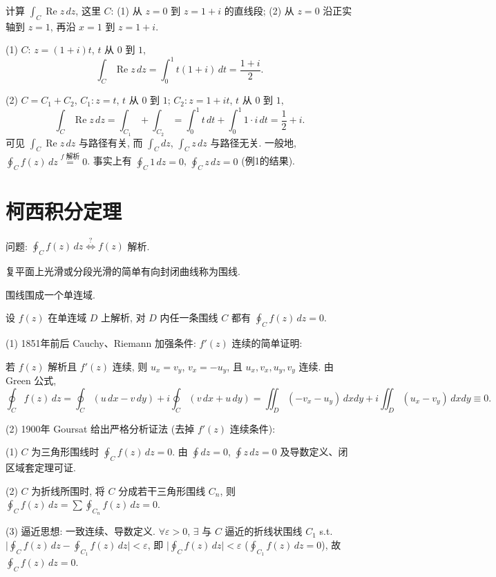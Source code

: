 \documentclass[theorem=false,mathfont=none,openany,sub3section]{easybook}
\begin{document}
\begin{example}
  计算 $\int_{C}\operatorname{Re}z\,dz$, 这里 $C$:
  (1) 从 $z=0$ 到 $z=1+i$ 的直线段;
  (2) 从 $z=0$ 沿正实轴到 $z=1$, 再沿 $x=1$ 到 $z=1+i$.

  (1) $C$: $z=(1+i)t$, $t$ 从 $0$ 到 $1$,
  \[
  \int_{C}\operatorname{Re}z\,dz=\int_{0}^{1}t(1+i)\,dt=\frac{1+i}{2}.
  \]

  (2) $C=C_{1}+C_{2}$, $C_{1}:z=t$, $t$ 从 $0$ 到 $1$; $C_{2}:z=1+it$, $t$ 从 $0$ 到 $1$,
  \[
  \int_{C}\operatorname{Re}z\,dz=\int_{C_{1}}+\int_{C_{2}}
  =\int_{0}^{1}t\,dt+\int_{0}^{1}1\cdot i\,dt=\frac{1}{2}+i.
  \]
  可见 $\int_{C}\operatorname{Re}z\,dz$ 与路径有关, 而 $\int_{C}dz$, $\int_{C}z\,dz$ 与路径无关.
  一般地, $\oint_{C}f(z)\,dz\stackrel{f\text{ 解析}}{=}0$.
  事实上有 $\oint_{C}1\,dz=0$, $\oint_{C}z\,dz=0$ (例1的结果).
\end{example}

\newpage

\section{柯西积分定理}

问题: $\oint_{C}f(z)\,dz\stackrel{?}{\Longleftrightarrow}f(z)$ 解析.

\begin{definition}
  复平面上光滑或分段光滑的简单有向封闭曲线称为围线.\par
  围线围成一个单连域.
\end{definition}

\begin{theorem}[柯西积分定理]
  设 $f(z)$ 在单连域 $D$ 上解析, 对 $D$ 内任一条围线 $C$ 都有 $\oint_{C}f(z)\,dz=0$.
\end{theorem}

\begin{remark}
  (1) 1851年前后 Cauchy、Riemann 加强条件: $f'(z)$ 连续的简单证明:

  若 $f(z)$ 解析且 $f'(z)$ 连续, 则 $u_{x}=v_{y}$, $v_{x}=-u_{y}$, 且 $u_{x},v_{x},u_{y},v_{y}$ 连续. 由 Green 公式,
  \[
  \oint_{C}f(z)\,dz=\oint_{C}(u\,dx-v\,dy)+i\oint_{C}(v\,dx+u\,dy)
  =\iint_{D}(-v_{x}-u_{y})\,dxdy+i\iint_{D}(u_{x}-v_{y})\,dxdy\equiv0.
  \]

  (2) 1900年 Goursat 给出严格分析证法 (去掉 $f'(z)$ 连续条件):

  (1) $C$ 为三角形围线时 $\oint_{C}f(z)\,dz=0$. 由 $\oint dz=0$, $\oint z\,dz=0$ 及导数定义、闭区域套定理可证.

  (2) $C$ 为折线所围时, 将 $C$ 分成若干三角形围线 $C_{n}$, 则
  $\oint_{C}f(z)\,dz=\sum\oint_{C_{n}}f(z)\,dz=0$.

  (3) 逼近思想: 一致连续、导数定义. $\forall\varepsilon>0$, $\exists$ 与 $C$ 逼近的折线状围线 $C_{1}$ s.t.
  $\bigl|\oint_{C}f(z)\,dz-\oint_{C_{1}}f(z)\,dz\bigr|<\varepsilon$,
  即 $\bigl|\oint_{C}f(z)\,dz\bigr|<\varepsilon$ ($\oint_{C_{1}}f(z)\,dz=0$), 故 $\oint_{C}f(z)\,dz=0$.
\end{remark}
\end{document}
